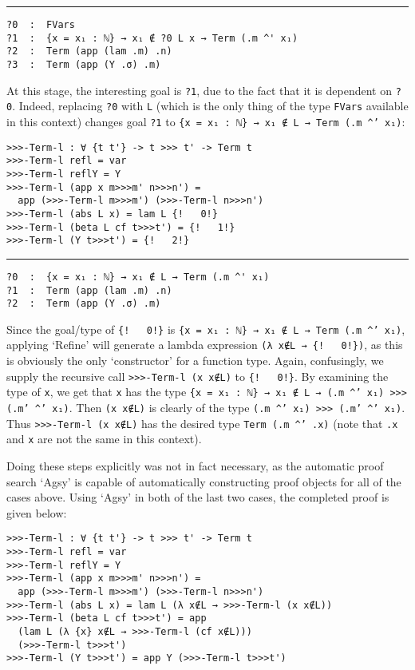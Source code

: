\documentclass[a4paper, 12pt, twoside]{style/ociamthesis}
\theoremstyle{plain}
\theoremstyle{definition}
\newtheorem{Example}{Example}[chapter]
\theoremstyle{remark}
\renewenvironment{Example}{\begin{OldExample}\begin{mdframed}[style=example, linecolor=yellow]}{\end{mdframed}\end{OldExample}}
\begin{document}
\begin{Example}
\noindent\rule{8cm}{0.4pt}

\begin{verbatim}
?0  :  FVars
?1  :  {x = x₁ : ℕ} → x₁ ∉ ?0 L x → Term (.m ^' x₁)
?2  :  Term (app (lam .m) .n)
?3  :  Term (app (Y .σ) .m)
\end{verbatim}

At this stage, the interesting goal is \texttt{?1}, due to the fact that
it is dependent on \texttt{?0}. Indeed, replacing \texttt{?0} with
\texttt{L} (which is the only thing of the type \texttt{FVars} available
in this context) changes goal \texttt{?1} to
\texttt{\{x = x₁ : ℕ\} → x₁ ∉ L → Term (.m \textasciicircum' x₁)}:

\begin{verbatim}
>>>-Term-l : ∀ {t t'} -> t >>> t' -> Term t
>>>-Term-l refl = var
>>>-Term-l reflY = Y
>>>-Term-l (app x m>>>m' n>>>n') = 
  app (>>>-Term-l m>>>m') (>>>-Term-l n>>>n')
>>>-Term-l (abs L x) = lam L {!   0!}
>>>-Term-l (beta L cf t>>>t') = {!   1!}
>>>-Term-l (Y t>>>t') = {!   2!}
\end{verbatim}

\noindent\rule{8cm}{0.4pt}

\begin{verbatim}
?0  :  {x = x₁ : ℕ} → x₁ ∉ L → Term (.m ^' x₁)
?1  :  Term (app (lam .m) .n)
?2  :  Term (app (Y .σ) .m)
\end{verbatim}

Since the goal/type of \texttt{\{!\ \ \ 0!\}} is
\texttt{\{x = x₁ : ℕ\} → x₁ ∉ L → Term (.m \textasciicircum' x₁)},
applying `Refine' will generate a lambda expression
\texttt{(λ x∉L → \{!\ \ \ 0!\})}, as this is obviously the only
`constructor' for a function type. Again, confusingly, we supply the
recursive call \texttt{>>>-Term-l (x x∉L)} to \texttt{\{!\ \ \ 0!\}}. By
examining the type of \texttt{x}, we get that \texttt{x} has the type
\texttt{\{x = x₁ : ℕ\} → x₁ ∉ L → (.m \textasciicircum' x₁) >>> (.m' \textasciicircum' x₁)}.
Then \texttt{(x x∉L)} is clearly of the type
\texttt{(.m \textasciicircum' x₁) >>> (.m' \textasciicircum' x₁)}. Thus
\texttt{>>>-Term-l (x x∉L)} has the desired type
\texttt{Term (.m \textasciicircum' .x)} (note that \texttt{.x} and
\texttt{x} are not the same in this context).

Doing these steps explicitly was not in fact necessary, as the automatic
proof search `Agsy' is capable of automatically constructing proof
objects for all of the cases above. Using `Agsy' in both of the last two
cases, the completed proof is given below:

\begin{verbatim}
>>>-Term-l : ∀ {t t'} -> t >>> t' -> Term t
>>>-Term-l refl = var
>>>-Term-l reflY = Y
>>>-Term-l (app x m>>>m' n>>>n') = 
  app (>>>-Term-l m>>>m') (>>>-Term-l n>>>n')
>>>-Term-l (abs L x) = lam L (λ x∉L → >>>-Term-l (x x∉L))
>>>-Term-l (beta L cf t>>>t') = app 
  (lam L (λ {x} x∉L → >>>-Term-l (cf x∉L))) 
  (>>>-Term-l t>>>t')
>>>-Term-l (Y t>>>t') = app Y (>>>-Term-l t>>>t')
\end{verbatim}

\end{Example}
\end{document}
